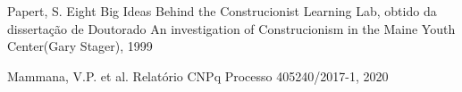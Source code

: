 \documentclass[
12pt,		%
openright,	%
twoside,  %
a4paper,			%
chapter=TITLE,		%
english,			%
french,				%
spanish,			%
brazil				%
]{USPSC-classe/USPSC}
\begin{document}
\begin{flushleft}
\begin{flushleft}
\begin{flushleft}
\begin{flushleft}
\begin{flushleft}
\begin{flushleft}
\begin{flushleft}
\begin{flushleft}
\begin{flushleft}
[PAPERT, 1999] Papert, S. Eight Big Ideas Behind the Construcionist Learning Lab, obtido da disserta\c{c}\~ao de Doutorado \textquotedbl An investigation of Construcionism in the Maine Youth Center\textquotedbl  (Gary Stager), 1999
\end{flushleft}


\end{flushleft}


\end{flushleft}


\end{flushleft}


\end{flushleft}


\end{flushleft}


\end{flushleft}


\end{flushleft}


\end{flushleft}


\begin{flushleft}
\begin{flushleft}
\begin{flushleft}
\begin{flushleft}
\begin{flushleft}
\begin{flushleft}
\begin{flushleft}
\begin{flushleft}
\begin{flushleft}
[MAMMANA et al., 2020] Mammana, V.P. et al. Relat\'orio CNPq Processo 405240/2017-1, 2020
\end{flushleft}


\end{flushleft}


\end{flushleft}


\end{flushleft}


\end{flushleft}


\end{flushleft}


\end{flushleft}


\end{flushleft}


\end{flushleft}
\end{document}
